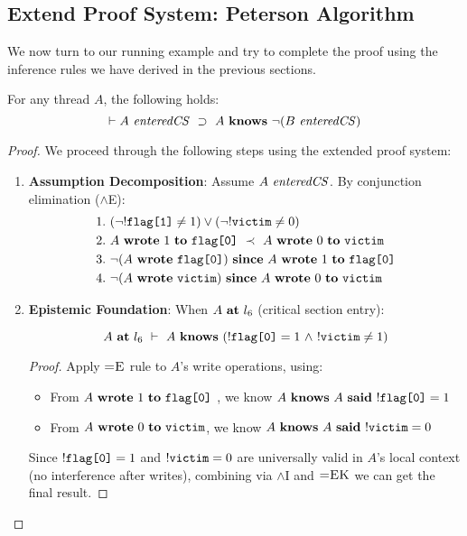 
\subsection{Extend Proof System: Peterson Algorithm}
\label{sec:petersoneg}
%
We now turn to our running example and try to complete the proof using the inference rules we have derived in the previous sections. 

\begin{lemma} For any thread \( A \), the following holds:
\[
    \vdash A\ \EntersCS\ \Implies\ A\ \Knows\ \neg (B\ \EntersCS)
\]
\end{lemma}

\begin{proof}
We proceed through the following steps using the extended proof system:

\begin{enumerate}

\item \textbf{Assumption Decomposition}:
Assume \( A\ \mathit{enteredCS} \). By conjunction elimination (\(\land\)E):
\begin{align*}
    &1.\ (\lnot!\FlagOne \neq 1) \lor (\lnot!\Victim \neq 0) \\
    &2.\ A\ \Writes\ 1\ \To\ \FlagZero\ \HappensBefore\ A\ \Writes\ 0\ \To\ \Victim \\
    &3.\ \neg(A\ \Writes\ \FlagZero)\ \Since\ A\ \Writes\ 1\ \To\ \FlagZero \\
    &4.\ \neg(A\ \Writes\ \Victim)\ \Since\ A\ \Writes\ 0\ \To\ \Victim
\end{align*}

\item \textbf{Epistemic Foundation}:
When \( A\ \mathbf{at}\ l_6 \) (critical section entry):
\begin{proposition}
\label{prop:local}
\[
A\ \mathbf{at}\ l_6\ \vdash\ A\ \mathbf{knows}\ (!\texttt{flag[0]} = 1\ \land\ !\texttt{victim} \neq 1 )
\]
\end{proposition}
\begin{proof}
Apply \(\textsc{=E}\) rule to \( A \)'s write operations, using:
\begin{itemize}
\item From \( A\ \Writes\ 1\ \To\ \FlagZero\ \), we know \( A\ \Knows\ A\ \Says\ !\FlagZero = 1 \)
\item From \( A\ \Writes\ 0\ \To\ \Victim \), we know \(A\ \Knows\ A\ \Says\ !\Victim = 0 \)
\end{itemize}
Since $!\texttt{flag[0]} = 1$ and $!\texttt{victim} = 0$ are universally valid in $A$'s local context (no interference after writes), combining via \(\land\)I and \(\textsc{=EK}\) we can get the final result.
\end{proof}


\end{enumerate}
\end{proof}
